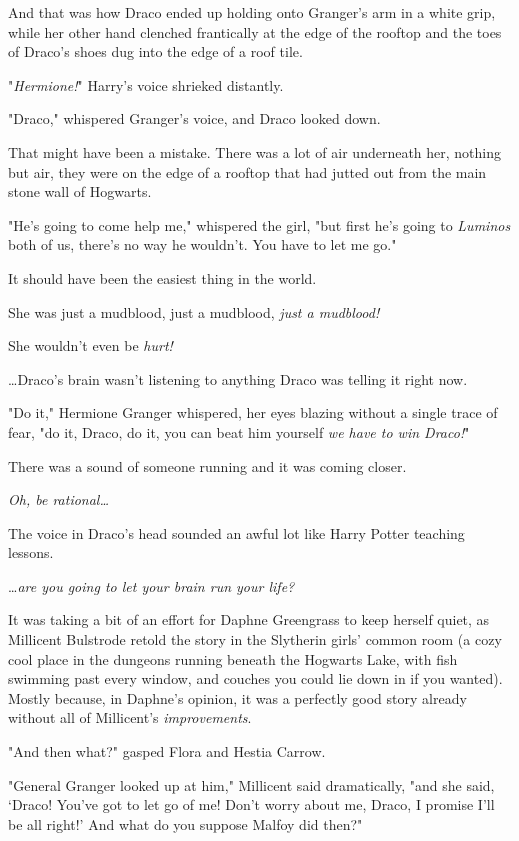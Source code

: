 And that was how Draco ended up holding onto Granger's arm in a white grip,
while her other hand clenched frantically at the edge of the rooftop and the
toes of Draco's shoes dug into the edge of a roof tile.

"\emph{Hermione!}" Harry's voice shrieked distantly.

"Draco," whispered Granger's voice, and Draco looked down.

That might have been a mistake. There was a lot of air underneath her, nothing
but air, they were on the edge of a rooftop that had jutted out from the main
stone wall of Hogwarts.

"He's going to come help me," whispered the girl, "but first he's going to
\emph{Luminos} both of us, there's no way he wouldn't. You have to let me go."

It should have been the easiest thing in the world.

She was just a mudblood, just a mudblood, \emph{just a mudblood!}

She wouldn't even be \emph{hurt!}

{\ldots}Draco's brain wasn't listening to anything Draco was telling it right
now.

"Do it," Hermione Granger whispered, her eyes blazing without a single trace of
fear, "do it, Draco, do it, you can beat him yourself \emph{we have to win
Draco!}"

There was a sound of someone running and it was coming closer.

\emph{Oh, be rational{\ldots}}

The voice in Draco's head sounded an awful lot like Harry Potter teaching
lessons.

{\ldots}\emph{are you going to let your brain run your life?}

It was taking a bit of an effort for Daphne Greengrass to keep herself quiet,
as Millicent Bulstrode retold the story in the Slytherin girls' common room (a
cozy cool place in the dungeons running beneath the Hogwarts Lake, with fish
swimming past every window, and couches you could lie down in if you wanted).
Mostly because, in Daphne's opinion, it was a perfectly good story already
without all of Millicent's \emph{improvements}.

"And then what?" gasped Flora and Hestia Carrow.

"General Granger looked up at him," Millicent said dramatically, "and she said,
`Draco! You've got to let go of me! Don't worry about me, Draco, I promise I'll
be all right!' And what do you suppose Malfoy did then?"

